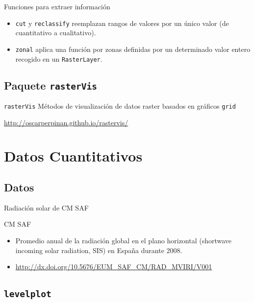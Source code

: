 \documentclass[xcolor={usenames,svgnames,dvipsnames}]{beamer}
\begin{document}
\begin{frame}[fragile,label=sec-1-2-6]{Funciones para extraer información}
 \begin{itemize}
\item \texttt{cut} y \texttt{reclassify} reemplazan rangos de valores por un único valor (de cuantitativo a cualitativo).
\item \texttt{zonal} aplica una función por zonas definidas por un determinado valor entero recogido en un \texttt{RasterLayer}.
\end{itemize}
\end{frame}
\subsection{Paquete \texttt{rasterVis}}
\label{sec-1-3}
\begin{frame}[fragile,label=sec-1-3-1]{}
 \begin{block}{\texttt{rasterVis}}
Métodos de visualización de datos raster basados en gráficos \texttt{grid}

\url{http://oscarperpinan.github.io/rastervis/}
\end{block}
\end{frame}


\section{Datos Cuantitativos}
\label{sec-2}

\subsection{Datos}
\label{sec-2-1}

\begin{frame}[label=sec-2-1-1]{Radiación solar de CM SAF}
\begin{block}{CM SAF}
\begin{itemize}
\item Promedio anual de la radiación global en el plano horizontal
(shortwave incoming solar radiation, SIS) en España durante 2008.
\item \url{http://dx.doi.org/10.5676/EUM_SAF_CM/RAD_MVIRI/V001}
\end{itemize}
\end{block}
\end{frame}

\subsection{\texttt{levelplot}}
\label{sec-2-2}
\end{document}
